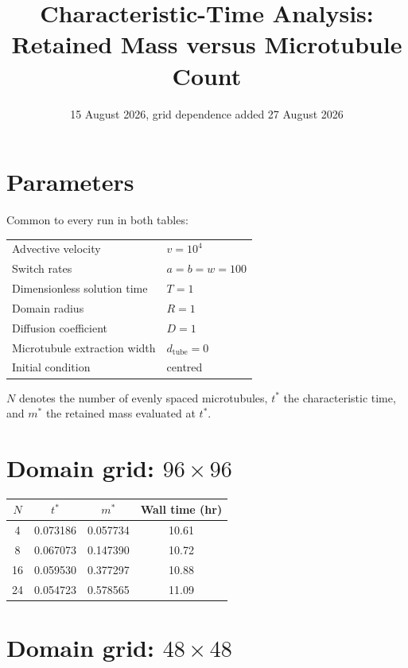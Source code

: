 \documentclass[11pt]{article}
\title{Characteristic-Time Analysis:\\ Retained Mass versus Microtubule Count}
\date{15 August 2026, grid dependence added 27 August 2026}
\author{}
\begin{document}
\maketitle

\section*{Parameters}

\noindent
Common to every run in both tables:

\medskip
\noindent
\begin{tabular}{ll}
\toprule
Advective velocity & $v = 10^{4}$ \\
Switch rates & $a = b = w = 100$ \\
Dimensionless solution time & $T = 1$ \\
Domain radius & $R = 1$ \\
Diffusion coefficient & $D = 1$ \\
Microtubule extraction width & $d_{\mathrm{tube}} = 0$ \\
Initial condition & centred \\
\bottomrule
\end{tabular}

\bigskip
\noindent
$N$ denotes the number of evenly spaced microtubules, $t^{*}$ the
characteristic time, and $m^{*}$ the retained mass evaluated at $t^{*}$.

\section*{Domain grid: $96 \times 96$}

\noindent
\begin{tabular}{
    S[table-format=2.0]
    S[table-format=1.6]
    S[table-format=1.6]
    S[table-format=2.2]
  }
\toprule
{$N$} & {$t^{*}$} & {$m^{*}$} & {Wall time (hr)} \\
 & 0.073186 & 0.057734 & 10.61 \\
 8 & 0.067073 & 0.147390 & 10.72 \\
16 & 0.059530 & 0.377297 & 10.88 \\
24 & 0.054723 & 0.578565 & 11.09 \\
\bottomrule
\end{tabular}

\section*{Domain grid: $48 \times 48$}
\end{document}
